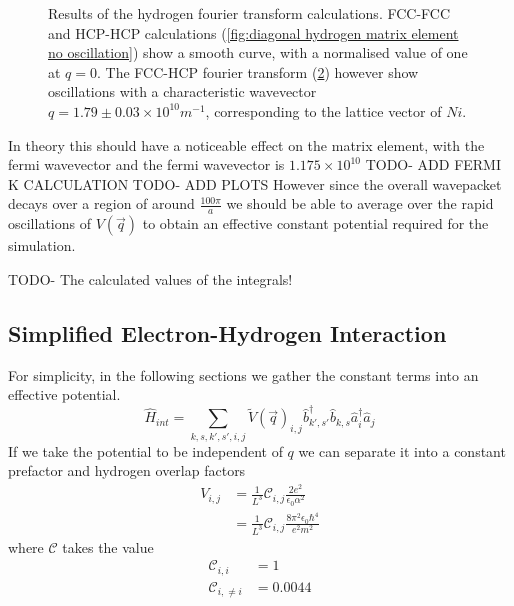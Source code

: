 \begin{figure}
\begin{subfigure}{0.45\linewidth}
    \label{fig:cross hydrogen matrix element oscillation}
  \end{subfigure}
  \caption{Results of the hydrogen fourier transform calculations.
  FCC-FCC and HCP-HCP calculations
  (\cref{fig:diagonal hydrogen matrix element no oscillation})
  show a smooth curve, with a normalised
  value of one at \(q=0\).
  The FCC-HCP fourier transform
  (\cref{fig:cross hydrogen matrix element oscillation})
  however show oscillations with a characteristic
  wavevector \(q = 1.79 \pm 0.03 \times{}10^{10}m^{-1}\),
  corresponding to the lattice vector of \(Ni\).}
\end{figure}

In theory this should have a noticeable
effect on the matrix element, with the
fermi wavevector
and the fermi wavevector is \(1.175\times{}10^{10}\) TODO- ADD FERMI K CALCULATION
TODO- ADD PLOTS
However since the overall wavepacket decays over a region
of around \(\frac{100\pi}{a}\) we should be
able to average over the rapid oscillations of
\(V(\vec{q})\) to obtain an effective constant
potential required for the simulation.

TODO- The calculated values of the integrals!

\subsection{Simplified Electron-Hydrogen Interaction}
For simplicity, in the following sections
we gather the constant terms into
an effective potential.
\begin{equation}
  \hat{H}_{int} = \sum_{k,s,k',s',i,j}
  {\tilde{V}(\vec{q})}_{i,j}
  \hat{b}^\dagger_{k',s'}\hat{b}_{k,s}
  \hat{a}^\dagger_{i}\hat{a}_{j}
  \label{eqn:interaction hamiltonian in k}
\end{equation}
If we take the potential to be independent
of \(q\) we can separate it
into a constant prefactor
and hydrogen overlap factors
\begin{align}
  V_{i,j}
   & =
  \frac{1}{L^3}
  \mathcal{C}_{i,j}
  \frac{2e^2}{\epsilon_0 \alpha^2} \\
   & =
  \frac{1}{L^3}
  \mathcal{C}_{i,j}
  \frac{8 \pi^2 \epsilon_0 \hbar^4}{e^2 m^2}
  \label{eqn:simplified interacton potential}
\end{align}
where \(\mathcal{C}\) takes
the value
\begin{align}
  \mathcal{C}_{i, i}      & = 1      \\
  \mathcal{C}_{i, \neq i} & = 0.0044
\end{align}

